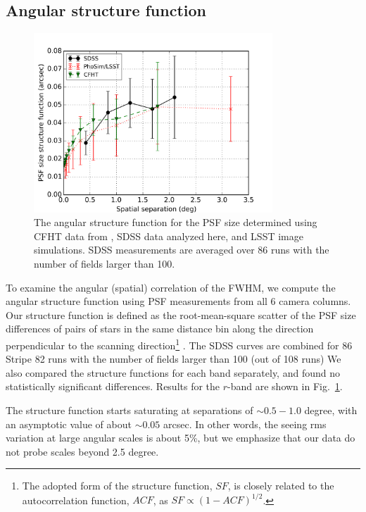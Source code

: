 \subsection{Angular structure function} 

\begin{figure}[th]
\centering
\includegraphics[width=0.8\textwidth]{FIGURES/spatial.png}
\caption{The angular structure function for the PSF size determined using 
  CFHT data from \cite{heymans2012}, SDSS data analyzed here, and LSST image simulations. 
  SDSS measurements are averaged over 86 runs with the number of fields larger than 100. 
\label{fig:spatial}}
\end{figure}

To examine the angular (spatial) correlation of the FWHM, we compute the angular
structure function using PSF measurements from all 6 camera columns.
Our structure function is defined as the root-mean-square scatter of the PSF size 
differences of pairs of stars in the same distance bin along the direction perpendicular
to the scanning direction\footnote{The adopted form 
of the structure function, $SF$, is closely related to the autocorrelation function, $ACF$, as 
$SF \propto (1-ACF)^{1/2}$.} .
The SDSS curves are combined for 86 Stripe 82 runs with the number of fields larger than 
100 (out of 108 runs) 
We also compared the structure functions for each band
separately, and found no statistically significant differences.
Results for the $r$-band are shown in Fig.~\ref{fig:spatial}.

The structure function starts saturating at separations of
$\sim 0.5 - 1.0$ degree, with an asymptotic value of about $\sim 0.05$ arcsec.
In other words, the seeing rms variation at large angular scales is about 5\%,
but we emphasize that our data do not probe scales beyond 2.5 degree. 

